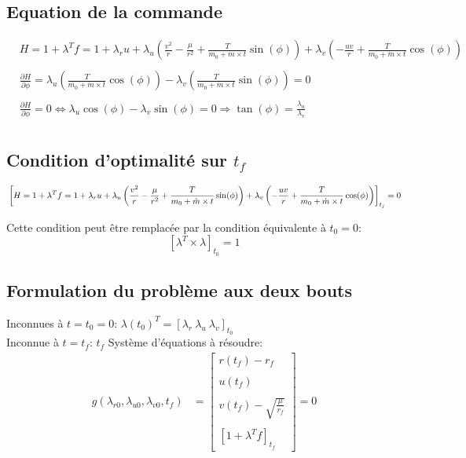 \documentclass{article}
\begin{document}
		\subsection{Equation de la commande}
		\begin{align*}
			& H=1+\lambda^T f=1+\lambda_r u+\lambda_u\left(\frac{v^2}{r}-\frac{\mu}{r^2}+\frac{T}{m_0+\dot{m} \times t} \sin (\phi)\right)+\lambda_v\left(-\frac{u v}{r}+\frac{T}{m_0+\dot{m} \times t} \cos (\phi)\right) \\ \\
			& \frac{\partial H}{\partial \phi}=\lambda_u\left(\frac{T}{m_0+\dot{m} \times t} \cos (\phi)\right)-\lambda_v\left(\frac{T}{m_0+\dot{m} \times t} \sin (\phi)\right)=0 \\ \\
			& \frac{\partial H}{\partial \phi}=0 \Leftrightarrow \lambda_u \cos (\phi)-\lambda_v \sin (\phi)=0 \Rightarrow \tan (\phi)=\frac{\lambda_u}{\lambda_v} \\
		\end{align*}
		
		\subsection{Condition d'optimalité sur $t_f$}
		\[
		\\
		\left[H=1+\lambda^T f=1+\lambda_r u+\lambda_u\left(\frac{v^2}{r}-\frac{\mu}{r^2}+\frac{T}{m_0+\dot{m} \times t} \sin (\phi)\right)+\lambda_v\left(-\frac{u v}{r}+\frac{T}{m_0+\dot{m} \times t} \cos (\phi)\right)\right]_{t_j}=0
		\\ \] \newline
		
		Cette condition peut être remplacée par la condition équivalente à $t_0=0$:
		\[
		\left[\lambda^T \times \lambda\right]_{t_0}=1
		\]
		
		\subsection{Formulation du problème aux deux bouts}
		Inconnues à $t=t_0=0$: $\lambda(t_0)^T = [\lambda_r \ \lambda_u \ \lambda_v]_{t_0}$ \\
		Inconnue à $t=t_f$: $t_f$
		Système d'équations à résoudre:
		\begin{align*}
			g(\lambda_{r0}, \lambda_{u0}, \lambda_{v0}, t_f) &= \left[\begin{array}{c}
				r(t_f) - r_f \\ \\
				u(t_f) \\ \\
				v(t_f) - \sqrt{\frac{\mu}{r_f}} \\ \\
				\left[1 + \lambda^T f\right]_{t_f}
			\end{array}\right] = 0
		\end{align*}
		
\end{document}
